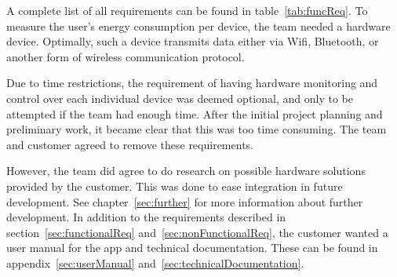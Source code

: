 A complete list of all requirements can be found in table~\ref{tab:funcReq}.
\noindent To measure the user's energy consumption per device, the team needed a hardware device. Optimally, such a device transmits  data either via Wifi, Bluetooth, or another form of wireless communication protocol.

Due to time restrictions, the requirement of having hardware monitoring and control over each individual device was deemed optional, and only to be attempted if the team had enough time. After the initial project planning and preliminary work, it became clear that this was too time consuming. The team and customer agreed to remove these requirements. 

However, the team did agree to do research on possible hardware solutions provided by the customer. This was done to ease integration in future development. See chapter~\ref{sec:further} for more information about further development. In addition to the requirements described in section~\ref{sec:functionalReq} and~\ref{sec:nonFunctionalReq}, the customer wanted a user manual for the app and technical documentation. These can be found in appendix~\ref{sec:userManual} and~\ref{sec:technicalDocumentation}.
